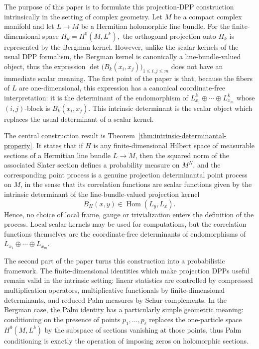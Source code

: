 \documentclass[12pt,a4paper,reqno]{article}
\theoremstyle{thmstyleone}
\theoremstyle{thmstylethree}
\theoremstyle{thmstyletwo}
\numberwithin{equation}{subsection}
\def\leq{\leqslant}
\begin{document}
The purpose of this paper is to formulate this projection-DPP construction intrinsically in the setting of complex geometry.  Let $M$ be a compact complex manifold and let $L\to M$ be a Hermitian holomorphic line bundle. For the finite-dimensional space $H_k=H^0(M,L^k),$ the orthogonal projection onto $H_k$ is represented by the Bergman kernel. However, unlike the scalar kernels of the usual DPP formalism, the Bergman kernel is canonically a line-bundle-valued object, thus the expression $\det\bigl(B_k(x_i,x_j)\bigr)_{1\leq i,j\leq m}$ does not have an immediate scalar meaning.  The first point of the paper is that, because the fibers of $L$ are one-dimensional, this expression has a canonical coordinate-free interpretation: it is the determinant of the endomorphism of $L^k_{x_1}\oplus\cdots\oplus L^k_{x_m}$ whose $(i,j)$-block is $B_k(x_i,x_j)$.  This intrinsic determinant is the scalar object which replaces the usual determinant of a scalar kernel.

The central construction result is Theorem~\ref{thm:intrinsic-determinantal-property}.  It states that if $H$ is any finite-dimensional Hilbert space of measurable sections of a Hermitian line bundle $L\to M$, then the squared norm of the associated Slater section defines a probability measure on $M^N$, and the corresponding point process is a genuine projection determinantal point process on $M$, in the sense that its correlation functions are scalar functions given by the intrinsic determinant of the line-bundle-valued projection kernel
\[
B_H(x,y)\in \operatorname{Hom}(L_y,L_x).
\]
Hence, no choice of local frame, gauge or trivialization enters the definition of the process.  Local scalar kernels may be used for computations, but the correlation functions themselves are the coordinate-free determinants of endomorphisms of
$L_{x_1}\oplus\cdots\oplus L_{x_m}$.

The second part of the paper turns this construction into a probabilistic framework.  The finite-dimensional identities which make projection DPPs useful remain valid in the intrinsic setting: linear statistics are controlled by compressed multiplication operators, multiplicative functionals by finite-dimensional determinants, and reduced Palm measures by Schur complements.  In the Bergman case, the Palm identity has a particularly simple geometric meaning: conditioning on the presence of points $p_1,\ldots,p_\ell$ replaces the one-particle space $H^0(M,L^k)$ by the subspace of sections vanishing at those points, thus Palm conditioning is exactly the operation of imposing zeros on holomorphic sections.
\end{document}
